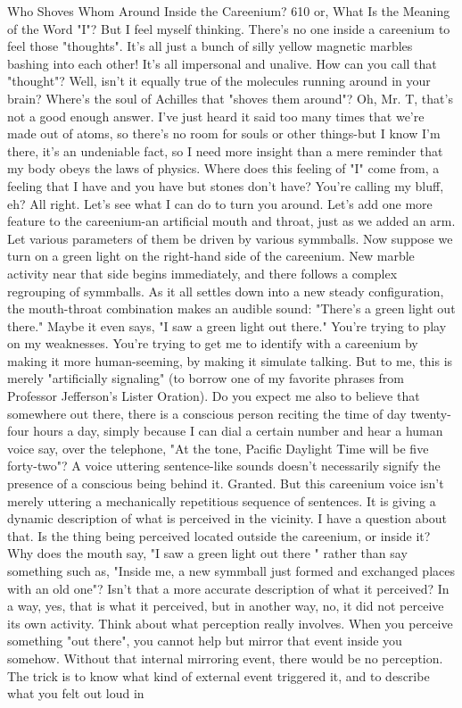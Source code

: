 Who Shoves Whom Around Inside the Careenium?                                           610
or, What Is the Meaning of the Word "I"?
\achilles But I feel myself thinking. There's no one inside a careenium to feel
  those "thoughts". It's all just a bunch of silly yellow magnetic marbles bashing into
  each other! It's all impersonal and unalive. How can you call that "thought"?
\tortoise Well, isn't it equally true of the molecules running around in your brain?
  Where's the soul of Achilles that "shoves them around"?
\achilles Oh, Mr. T, that's not a good enough answer. I've just heard it said too
  many times that we're made out of atoms, so there's no room for souls or other
  things-but I know I'm there, it's an undeniable fact, so I need more insight than a
  mere reminder that my body obeys the laws of physics. Where does this feeling of
  "I" come from, a feeling that I have and you have but stones don't have?
\tortoise You're calling my bluff, eh? All right. Let's see what I can do to turn you
  around. Let's add one more feature to the careenium-an artificial mouth and throat,
  just as we added an arm. Let various parameters of them be driven by various
  symmballs. Now suppose we turn on a green light on the right-hand side of the
  careenium. New marble activity near that side begins immediately, and there
  follows a complex regrouping of symmballs. As it all settles down into a new
  steady configuration, the mouth-throat combination makes an audible sound:
  "There's a green light out there." Maybe it even says, "I saw a green light out
  there."
\achilles You're trying to play on my weaknesses. You're trying to get me to
  identify with a careenium by making it more human-seeming, by making it
  simulate talking. But to me, this is merely "artificially signaling" (to borrow one of
  my favorite phrases from Professor Jefferson's Lister Oration). Do you expect me
  also to believe that somewhere out there, there is a conscious person reciting the
  time of day twenty-four hours a day, simply because I can dial a certain number
  and hear a human voice say, over the telephone, "At the tone, Pacific Daylight
  Time will be five forty-two"? A voice uttering sentence-like sounds doesn't
  necessarily signify the presence of a conscious being behind it.
\tortoise Granted. But this careenium voice isn't merely uttering a mechanically
  repetitious sequence of sentences. It is giving a dynamic description of what is
  perceived in the vicinity.
\achilles I have a question about that. Is the thing being perceived located outside
  the careenium, or inside it? Why does the mouth say, "I saw a green light out there
  " rather than say something such as, "Inside me, a new symmball just formed and
  exchanged places with an old one"? Isn't that a more accurate description of what it
  perceived?
\tortoise In a way, yes, that is what it perceived, but in another way, no, it did not
  perceive its own activity. Think about what perception really involves. When you
  perceive something "out there", you cannot help but mirror that event inside you
  somehow. Without that internal mirroring event, there would be no perception. The
  trick is to know what kind of external event triggered it, and to describe what you
  felt out loud in




